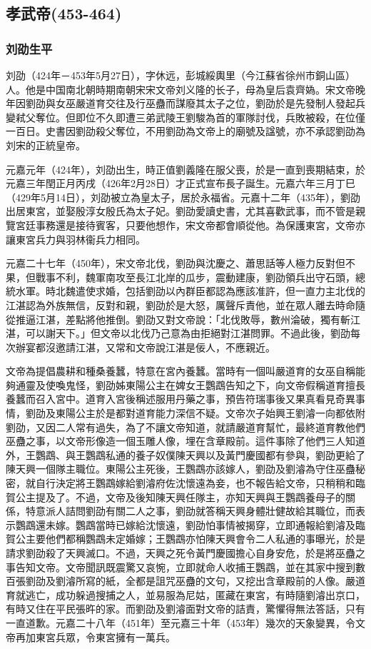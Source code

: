
\subsection{孝武帝\tiny(453-464)}

\subsubsection{刘劭生平}

刘劭（424年－453年5月27日），字休远，彭城綏輿里（今江蘇省徐州市銅山區）人。他是中国南北朝時期南朝宋宋文帝刘义隆的长子，母為皇后袁齊媯。宋文帝晚年因劉劭與女巫嚴道育交往及行巫蠱而謀廢其太子之位，劉劭於是先發制人發起兵變弒父奪位。但即位不久即遭三弟武陵王劉駿為首的軍隊討伐，兵敗被殺，在位僅一百日。史書因劉劭殺父奪位，不用劉劭為文帝上的廟號及諡號，亦不承認劉劭為刘宋的正統皇帝。

元嘉元年（424年），刘劭出生，時正值劉義隆在服父喪，於是一直到喪期結束，於元嘉三年閏正月丙戌（426年2月28日）才正式宣布長子誕生。元嘉六年三月丁巳（429年5月14日），刘劭被立為皇太子，居於永福省。元嘉十二年（435年），劉劭出居東宮，並娶殷淳女殷氏為太子妃。劉劭愛讀史書，尤其喜歡武事，而不管是親覽宮廷事務還是接待賓客，只要他想作，宋文帝都會順從他。為保護東宮，文帝亦讓東宮兵力與羽林衞兵力相同。

元嘉二十七年（450年），宋文帝北伐，劉劭與沈慶之、蕭思話等人極力反對但不果，但戰事不利，魏軍南攻至長江北岸的瓜步，震動建康，劉劭領兵出守石頭，總統水軍。時北魏遣使求婚，包括劉劭以內群臣都認為應該准許，但一直力主北伐的江湛認為外族無信，反對和親，劉劭於是大怒，厲聲斥責他，並在眾人離去時命隨從推逼江湛，差點將他推倒。劉劭又對文帝說：「北伐敗辱，數州淪破，獨有斬江湛，可以謝天下。」但文帝以北伐乃己意為由拒絕對江湛問罪。不過此後，劉劭每次辦宴都沒邀請江湛，又常和文帝說江湛是佞人，不應親近。

文帝為提倡農耕和種桑養蠶，特意在宮內養蠶。當時有一個叫嚴道育的女巫自稱能夠通靈及使喚鬼怪，劉劭姊東陽公主在婢女王鸚鵡告知之下，向文帝假稱道育擅長養蠶而召入宮中。道育入宮後稱述服用丹藥之事，預告符瑞事後又果真看見奇異事情，劉劭及東陽公主於是都對道育能力深信不疑。文帝次子始興王劉濬一向都依附劉劭，又因二人常有過失，為了不讓文帝知道，就請嚴道育幫忙，最終道育教他們巫蠱之事，以文帝形像造一個玉雕人像，埋在含章殿前。這件事除了他們三人知道外，王鸚鵡、與王鸚鵡私通的養子奴僕陳天興以及黃門慶國都有參與，劉劭更給了陳天興一個隊主職位。東陽公主死後，王鸚鵡亦該嫁人，劉劭及劉濬為守住巫蠱秘密，就自行決定將王鸚鵡嫁給劉濬府佐沈懷遠為妾，也不報告給文帝，只稍稍和臨賀公主提及了。不過，文帝及後知陳天興任隊主，亦知天興與王鸚鵡養母子的關係，特意派人詰問劉劭有關二人之事，劉劭就答稱天興身體壯健故給其職位，而表示鸚鵡還未嫁。鸚鵡當時已嫁給沈懷遠，劉劭怕事情被揭穿，立即通報給劉濬及臨賀公主要他們都稱鸚鵡未定婚嫁；王鸚鵡亦怕陳天興會令二人私通的事曝光，於是請求劉劭殺了天興滅口。不過，天興之死令黃門慶國擔心自身安危，於是將巫蠱之事告知文帝。文帝聞訊既震驚又哀惋，立即就命人收捕王鸚鵡，並在其家中搜到數百張劉劭及劉濬所寫的紙，全都是詛咒巫蠱的文句，又挖出含章殿前的人像。嚴道育就逃亡，成功躲過搜捕之人，並易服為尼姑，匿藏在東宮，有時隨劉濬出京口，有時又住在平民張旿的家。而劉劭及劉濬面對文帝的詰責，驚懼得無法答話，只有一直道歉。元嘉二十八年（451年）至元嘉三十年（453年）幾次的天象變異，令文帝再加東宮兵眾，令東宮擁有一萬兵。

